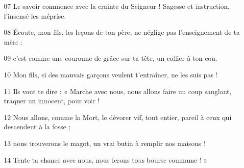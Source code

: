 
07 Le savoir commence avec la crainte du Seigneur ! Sagesse et instruction, l’insensé les méprise.

08 Écoute, mon fils, les leçons de ton père, ne néglige pas l’enseignement de ta mère :

09 c’est comme une couronne de grâce sur ta tête, un collier à ton cou.

10 Mon fils, si des mauvais garçons veulent t’entraîner, ne les suis pas !

11 Ils vont te dire : « Marche avec nous, nous allons faire un coup sanglant, traquer un innocent, pour voir !

12 Nous allons, comme la Mort, le dévorer vif, tout entier, pareil à ceux qui descendent à la fosse ;

13 nous trouverons le magot, un vrai butin à remplir nos maisons !

14 Tente ta chance avec nous, nous ferons tous bourse commune ! »
